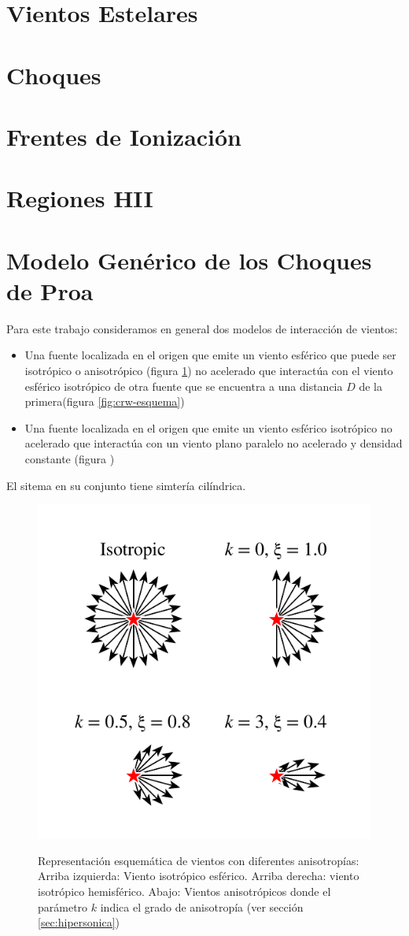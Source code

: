 \section{Vientos Estelares}
\section{Choques}
\section{Frentes de Ionización}
\section{Regiones HII}
\section{Modelo Genérico de los Choques de Proa}
\label{sec:Modelo-generico}
Para este trabajo consideramos en general dos modelos de
interacción  de vientos:
\begin{itemize}
\item Una fuente localizada en el origen que emite un viento esférico
  que puede ser isotrópico o anisotrópico (figura
  \ref{fig:isotropic-aniso}) no acelerado que interactúa con el viento
  esférico isotrópico de otra fuente que se encuentra a una distancia
  $D$ de la primera(figura \ref{fig:crw-esquema})
\item Una fuente localizada en el origen que emite un viento esférico
  isotrópico no acelerado que interactúa con un viento plano paralelo
  no acelerado y densidad constante (figura )
\end{itemize}
El sitema en su conjunto tiene simtería cilíndrica.
\begin{figure}
  \includegraphics[width=0.5\linewidth]{./Figures/anisotropic-arrows}
  \label{fig:isotropic-aniso}
  \caption{Representación esquemática de vientos con diferentes
    anisotropías:
    Arriba izquierda: Viento isotrópico esférico. Arriba derecha: viento
    isotrópico hemisférico. Abajo: Vientos anisotrópicos donde el
    parámetro $k$ indica el grado de anisotropía (ver sección
    \ref{sec:hipersonica})}
\end{figure}
